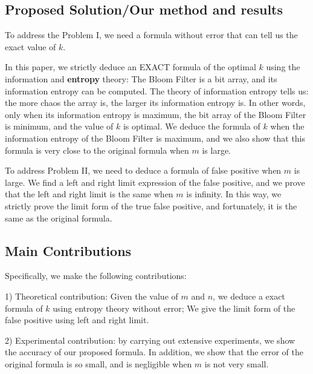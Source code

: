 \subsection{Proposed Solution/Our method and results}

To address the Problem I, we need a formula without error that can tell us the exact value of $k$. 

In this paper, we strictly deduce an EXACT formula of the optimal $k$ using the information and \textbf{entropy} theory: The Bloom Filter is a bit array, and its information entropy can be computed. The theory of information entropy tells us: the more chaos the array is, the larger its information entropy is. In other words, only when its information entropy is maximum, the bit array of the Bloom Filter is minimum, and the value of $k$ is optimal. We deduce the formula of $k$ when the information entropy of the Bloom Filter is maximum, and we also show that this formula is very close to the original formula when $m$ is large. 

To address Problem II, we need to deduce a formula of false positive when $m$ is large. We find a left and right limit expression of the false positive, and we prove that the left and right limit is the same when $m$ is infinity. 
In this way, we strictly prove the limit form of the true false positive, and fortunately, it is the same as the original formula.

\subsection{Main Contributions}

Specifically, we make the following contributions:

1) Theoretical contribution: Given the value of $m$ and $n$, we deduce a exact formula of $k$ using entropy theory without error; We give the limit form of the false positive using left and right limit.

2) Experimental contribution: by carrying out extensive experiments, we show the accuracy of our proposed formula. In addition, we show that the error of the original formula is so small, and is negligible when $m$ is not very small. 







